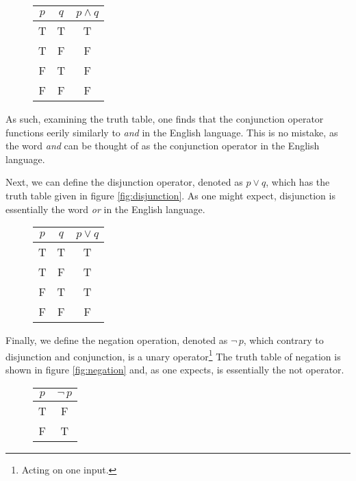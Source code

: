 \begin{figure}[h]
	\centering
	\begin{tabular}{ |c|c|c| }
		\hline
		$p$ & $q$ & $p\wedge q$ \\
		\hline
		T & T & T \\
		\hline
		T & F & F\\
		\hline
			F & T & F\\
		\hline
		F & F & F\\
		\hline
	\end{tabular}
	\caption{}
	\label{fig:conjunction}	
\end{figure}

As such, examining the truth table, one finds that the conjunction operator functions eerily similarly to \textit{and} in the English language.
This is no mistake, as the word \textit{and} can be thought of as the conjunction operator in the English language.

Next, we can define the disjunction operator, denoted as $p\vee q$, which has the truth table given in figure \eqref{fig:disjunction}.
As one might expect, disjunction is essentially the word \textit{or} in the English language.

\begin{figure}[h]
	\centering
	\begin{tabular}{ |c|c|c| }
		\hline
		$p$ & $q$ & $p\vee q$ \\
		\hline
		T & T & T \\
		\hline
		T & F & T\\
		\hline
		F & T & T\\
		\hline
		F & F & F\\
		\hline
	\end{tabular}
	\caption{}
	\label{fig:disjunction}	
\end{figure}

Finally, we define the negation operation, denoted as $\neg \, p$, which contrary to disjunction and conjunction, is a unary operator\footnote{
Acting on one input.}
The truth table of negation is shown in figure \eqref{fig:negation} and, as one expects, is essentially the not operator.

\begin{figure}[h]
	\centering
	\begin{tabular}{ |c|c| }
		\hline
		$p$  & $\neg \, p$ \\
		\hline
		T & F \\
		\hline
		F & T \\
		\hline
	\end{tabular}
	\caption{}
	\label{fig:negation}	
\end{figure}

